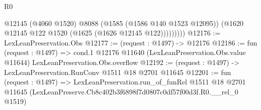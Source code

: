 \begin{lexlean}{R0}
\begin{coremodule}
                @12145
                (@4060 @1520)
                @8088
                (@1585 (@1586 @140 @1523 @12095))
                (@1620 @12145 @122 @1520 (@1625 (@1626 @12145 @122)))))))))
@12176 := LexLeanPreservation.Obs
@12177 := (request : @1497) -> @12176
@12186 := fun (request : @1497) =>
  cond.{1} @12176 @11640 (LexLeanPreservation.Obs.value @11644) LexLeanPreservation.Obs.overflow
@12192 := (request : @1497) -> LexLeanPreservation.RunConv @1511 @18 @2701 @11645
@12201 := fun (request : @1497) =>
  LexLeanPreservation.run_of_funRel
    @1511
    @18
    @2701
    @11645
    (LexLeanPreserve.Cb8c402b3f6898f7d0807c0df57f00d3f.R0.__rel_0 @1519)
\end{coremodule}
\end{lexlean}
